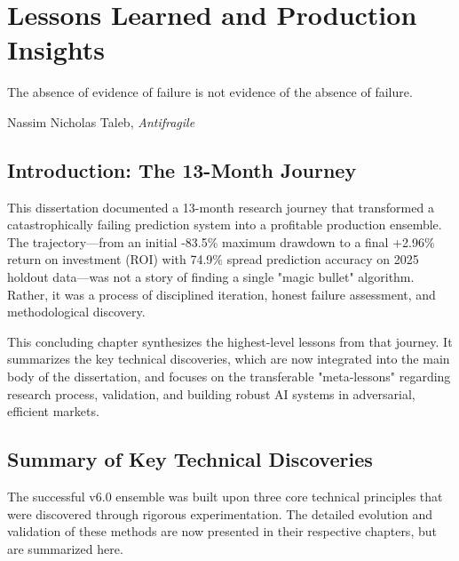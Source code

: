 \chapter{Lessons Learned and Production Insights}
\label{chap:lessons-learned}

\epigraph{The absence of evidence of failure is not evidence of the absence
of failure.}{Nassim Nicholas Taleb, \textit{Antifragile}}


\section{Introduction: The 13-Month Journey}

This dissertation documented a 13-month research journey that transformed a catastrophically failing prediction system into a profitable production ensemble. The trajectory---from an initial -83.5\% maximum drawdown to a final +2.96\% return on investment (ROI) with 74.9\% spread prediction accuracy on 2025 holdout data---was not a story of finding a single "magic bullet" algorithm. Rather, it was a process of disciplined iteration, honest failure assessment, and methodological discovery.

This concluding chapter synthesizes the highest-level lessons from that journey. It summarizes the key technical discoveries, which are now integrated into the main body of the dissertation, and focuses on the transferable "meta-lessons" regarding research process, validation, and building robust AI systems in adversarial, efficient markets.

\section{Summary of Key Technical Discoveries}

The successful v6.0 ensemble was built upon three core technical principles that were discovered through rigorous experimentation. The detailed evolution and validation of these methods are now presented in their respective chapters, but are summarized here.

